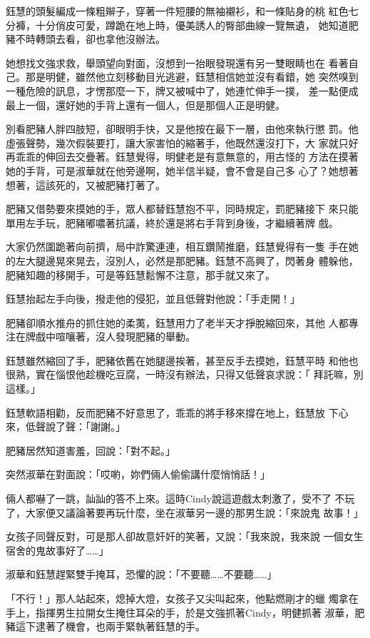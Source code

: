 鈺慧的頭髮編成一條粗辮子，穿著一件短腰的無袖襯衫，和一條貼身的桃
紅色七分褲，十分俏皮可愛，蹲跪在地上時，優美誘人的臀部曲線一覽無遺，
她知道肥豬不時轉頭去看，卻也拿他沒辦法。

她想找文強求救，舉頭望向對面，沒想到一抬眼發現還有另一雙眼睛也在
看著自己。那是明健，雖然他立刻移動目光逃避，鈺慧相信她並沒有看錯，她
突然嗅到一種危險的訊息，才愣那麼一下，牌又被喊中了，她連忙伸手一撲，
差一點便成最上一個，還好她的手背上還有一個人，但是那個人正是明健。

別看肥豬人胖四肢短，卻眼明手快，又是他按在最下一層，由他來執行懲
罰。他虛張聲勢，幾次假裝要打，讓大家害怕的縮著手，他既然還沒打下，大
家就只好再乖乖的伸回去交疊著。鈺慧覺得，明健老是有意無意的，用古怪的
方法在摸著她的手背，可是淑華就在他旁邊啊，她半信半疑，會不會是自己多
心了？她想著想著，這該死的，又被肥豬打著了。

肥豬又借勢要來摸她的手，眾人都替鈺慧抱不平，同時規定，罰肥豬接下
來只能單用左手玩，肥豬嘟噥著抗議，終於還是將右手背到身後，才繼續著牌
戲。

大家仍然圍跪著向前擠，局中詐驚連連，相互鑽鬧推磨，鈺慧覺得有一隻
手在她的左大腿邊晃來晃去，沒別人，必然是那肥豬。鈺慧不高興了，閃著身
體躲他，肥豬知趣的移開手，可是等鈺慧鬆懈不注意，那手就又來了。

鈺慧抬起左手向後，撥走他的侵犯，並且低聲對他說：「手走開！」

肥豬卻順水推舟的抓住她的柔荑，鈺慧用力了老半天才掙脫縮回來，其他
人都專注在牌戲中喧嚷著，沒人發現肥豬的舉動。

鈺慧雖然縮回了手，肥豬依舊在她腿邊挨著，甚至反手去摸她，鈺慧平時
和他也很熟，實在惱恨他趁機吃豆腐，一時沒有辦法，只得又低聲哀求說：「
拜託嘛，別這樣。」

鈺慧軟語相勸，反而肥豬不好意思了，乖乖的將手移來撐在地上，鈺慧放
下心來，低聲說了聲：「謝謝。」

肥豬居然知道害羞，回說：「對不起。」

突然淑華在對面說：「哎喲，妳們倆人偷偷講什麼悄悄話！」

倆人都嚇了一跳，訕訕的答不上來。這時Cindy說這遊戲太刺激了，受不了
不玩了，大家便又議論著要再玩什麼，坐在淑華另一邊的那男生說：「來說鬼
故事！」

女孩子同聲反對，可是那人卻故意奸奸的笑著，又說：「我來說，我來說
一個女生宿舍的鬼故事好了……」

淑華和鈺慧趕緊雙手掩耳，恐懼的說：「不要聽……不要聽……」

「不行！」那人站起來，熄掉大燈，女孩子又尖叫起來，他點燃剛才的蠟
燭拿在手上，指揮男生拉開女生掩住耳朵的手，於是文強抓著Cindy，明健抓著
淑華，肥豬這下逮著了機會，也兩手緊執著鈺慧的手。

